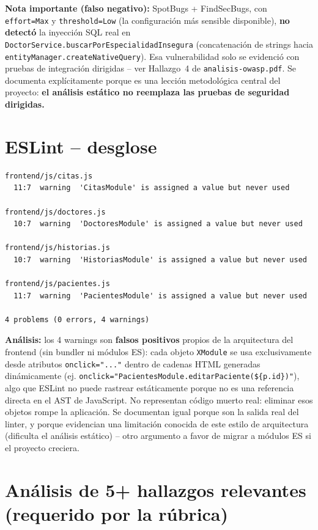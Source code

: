\documentclass[11pt,a4paper]{article}
\begin{document}
\textbf{Nota importante (falso negativo):} SpotBugs + FindSecBugs, con
\texttt{effort=Max} y \texttt{threshold=Low} (la configuraci\'on m\'as
sensible disponible), \textbf{no detect\'o} la inyecci\'on SQL real en
\texttt{DoctorService.buscarPorEspecialidadInsegura} (concatenaci\'on de
strings hacia \texttt{entityManager.createNativeQuery}). Esa vulnerabilidad
solo se evidenci\'o con pruebas de integraci\'on dirigidas -- ver Hallazgo~4
de \texttt{analisis-owasp.pdf}. Se documenta expl\'icitamente porque es una
lecci\'on metodol\'ogica central del proyecto: \textbf{el an\'alisis
est\'atico no reemplaza las pruebas de seguridad dirigidas.}

\section{ESLint -- desglose}

\begin{lstlisting}
frontend/js/citas.js
  11:7  warning  'CitasModule' is assigned a value but never used

frontend/js/doctores.js
  10:7  warning  'DoctoresModule' is assigned a value but never used

frontend/js/historias.js
  10:7  warning  'HistoriasModule' is assigned a value but never used

frontend/js/pacientes.js
  11:7  warning  'PacientesModule' is assigned a value but never used

4 problems (0 errors, 4 warnings)
\end{lstlisting}

\textbf{An\'alisis:} los 4 warnings son \textbf{falsos positivos} propios de
la arquitectura del frontend (sin bundler ni m\'odulos ES): cada objeto
\texttt{XModule} se usa exclusivamente desde atributos \texttt{onclick="..."}
dentro de cadenas HTML generadas din\'amicamente
(ej. \texttt{onclick="PacientesModule.editarPaciente(\$\{p.id\})"}), algo que
ESLint no puede rastrear est\'aticamente porque no es una referencia directa
en el AST de JavaScript. No representan c\'odigo muerto real: eliminar esos
objetos rompe la aplicaci\'on. Se documentan igual porque son la salida real
del linter, y porque evidencian una limitaci\'on conocida de este estilo de
arquitectura (dificulta el an\'alisis est\'atico) -- otro argumento a favor de
migrar a m\'odulos ES si el proyecto creciera.

\section{An\'alisis de 5+ hallazgos relevantes (requerido por la r\'ubrica)}
\end{document}
